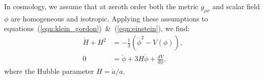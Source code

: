 In cosmology, we assume that at zeroth order both the metric $g_{\mu\nu}$ and scalar field $\phi$ are homogeneous and isotropic. Applying these assumptions to equations~(\ref{eqn:klein_gordon})~\&~(\ref{eqn:einstein}), we find:
\begin{align}
  \dot{H}+H^2 &= -\frac{1}{3}\left( \dot{\phi}^2 - V(\phi) \right),
  \label{eqn:Raychaudhuri}\\
  0&=\ddot{\phi} + 3H\dot{\phi} + \frac{dV}{d\phi},
\end{align}
where the Hubble parameter $H = \dot{a}/a$.
